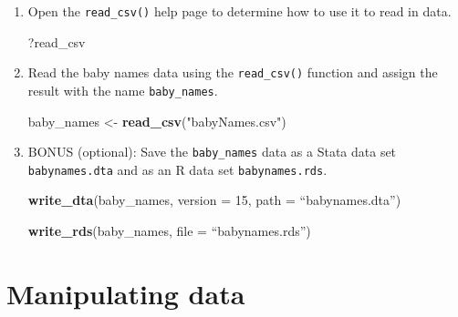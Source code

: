 \documentclass[
]{book}
\newenvironment{Shaded}{\begin{snugshade}}{\end{snugshade}}
\newcommand{\DataTypeTok}[1]{\textcolor[rgb]{0.13,0.29,0.53}{#1}}
\newcommand{\DecValTok}[1]{\textcolor[rgb]{0.00,0.00,0.81}{#1}}
\newcommand{\KeywordTok}[1]{\textcolor[rgb]{0.13,0.29,0.53}{\textbf{#1}}}
\newcommand{\NormalTok}[1]{#1}
\newcommand{\StringTok}[1]{\textcolor[rgb]{0.31,0.60,0.02}{#1}}
\begin{document}
\begin{alert}

\begin{enumerate}
\def\labelenumi{\arabic{enumi}.}
\item
  Open the \texttt{read\_csv()} help page to determine how to use it to read in data.

\begin{Shaded}
\begin{Highlighting}[]
\NormalTok{?read\_csv}
\end{Highlighting}
\end{Shaded}
\item
  Read the baby names data using the \texttt{read\_csv()} function and assign the result with the name \texttt{baby\_names}.

\begin{Shaded}
\begin{Highlighting}[]
\NormalTok{baby\_names \textless{}{-}}\StringTok{ }\KeywordTok{read\_csv}\NormalTok{(}\StringTok{"babyNames.csv"}\NormalTok{)}
\end{Highlighting}
\end{Shaded}
\item
  BONUS (optional): Save the \texttt{baby\_names} data as a Stata data set \texttt{babynames.dta} and as an R data set \texttt{babynames.rds}.

\begin{Shaded}
\begin{Highlighting}[]
\KeywordTok{write\_dta}\NormalTok{(baby\_names, }\DataTypeTok{version =} \DecValTok{15}\NormalTok{, }\DataTypeTok{path =}\NormalTok{ “babynames.dta”)}

\KeywordTok{write\_rds}\NormalTok{(baby\_names, }\DataTypeTok{file =}\NormalTok{ “babynames.rds”)}
\end{Highlighting}
\end{Shaded}
\end{enumerate}

\end{alert}

\hypertarget{manipulating-data}{%
\section{Manipulating data}\label{manipulating-data}}
\end{document}

